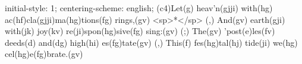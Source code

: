 initial-style: 1;
centering-scheme: english;
(c4)Let(g) heav'n(gjji) with(hg) ac(hf)cla(gjji)ma(hg)tions(fg) rings,(gv) <sp>*</sp> (,)
And(gv) earth(gji) with(jk) joy(kv) re(ji)spon(hg)sive(fg) sing:(gv) (;)
The(gv) 'post(e)les(fv) deeds(d) and(dg) high(hi) es(fg)tate(gv) (,)
This(f) fes(hg)tal(hj) tide(ji) we(hg) cel(hg)e(fg)brate.(gv)
